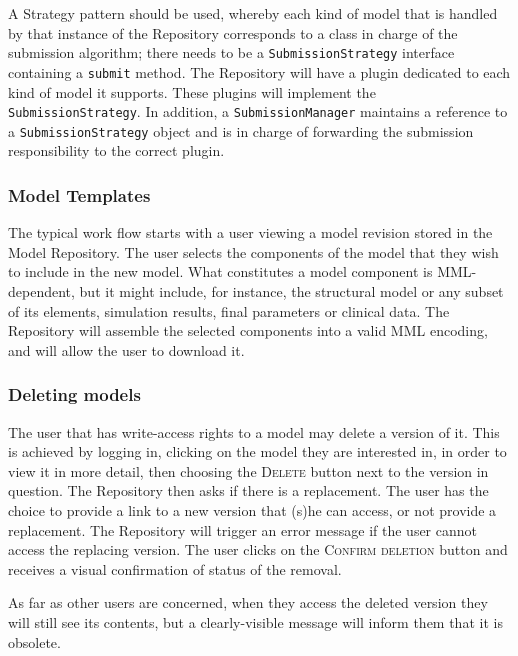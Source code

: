 \begin{techNote}
A Strategy pattern should be used, whereby each kind of model that is handled by that instance of the Repository corresponds to a class in charge of the submission algorithm; there needs to be a \texttt{SubmissionStrategy} interface containing a \texttt{submit} method. The Repository will have a plugin dedicated to each kind of model it supports. These plugins will implement the \texttt{SubmissionStrategy}. In addition, a \texttt{SubmissionManager} maintains a reference to a \texttt{SubmissionStrategy} object and is in charge of forwarding the submission responsibility to the correct plugin.
\end{techNote}

\subsubsection{Model Templates}

The typical work flow starts with a user viewing a model revision stored in the \ddmore Model Repository. The user selects the components of the model that they wish to include in the new model. What constitutes a model component is MML-dependent, but it might include, for instance, the structural model or any subset of its elements, simulation results, final parameters or clinical data. The Repository will assemble the selected components into a valid MML encoding, and will allow the user to download it. 

\subsubsection{Deleting models}
The user that has write-access rights to a model may delete a version of it.  This is achieved by logging in, clicking on the model they are interested in, in order to view it in more detail, then choosing the \textsc{Delete} button next to the version in question. The Repository then asks if there is a replacement. The user has the choice to provide a link to a new version that (s)he can access, or not provide a replacement. The Repository will trigger an error message if the user cannot access the replacing version. The user clicks on the \textsc{Confirm deletion} button and receives a visual confirmation of status of the removal. 

As far as other users are concerned, when they access the deleted version they will still see its contents, but a clearly-visible message will inform them that it is obsolete.

